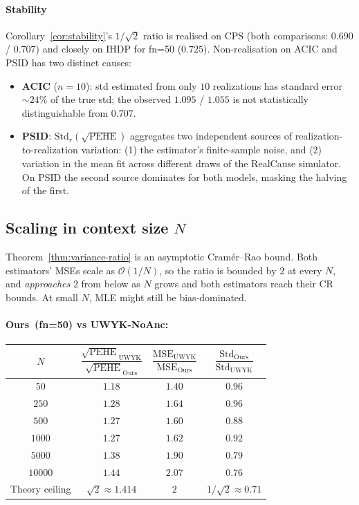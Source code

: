 \documentclass[11pt]{article}
\theoremstyle{remark}
\begin{document}
\paragraph{Stability} Corollary~\ref{cor:stability}'s $1/\sqrt{2}$ ratio is realised on
CPS (both comparisons: $0.690$ / $0.707$) and closely on IHDP for
fn=50 ($0.725$). Non-realisation on ACIC and PSID has two distinct
causes:
\begin{itemize}
  \item \textbf{ACIC} ($n = 10$): std estimated from only $10$
    realizations has standard error $\sim 24\%$ of the true std;
    the observed $1.095$ / $1.055$ is not statistically
    distinguishable from $0.707$.
  \item \textbf{PSID}: $\mathrm{Std}_r(\sqrt{\mathrm{PEHE}})$
    aggregates two independent sources of realization-to-realization
    variation: (1) the estimator's finite-sample noise, and (2) variation in the mean fit across different draws of the
    RealCause simulator. On PSID
    the second source dominates for both models, masking the halving of the first.
\end{itemize}

\subsection{Scaling in context size $N$}
\label{subsec:scaling-N}

Theorem~\ref{thm:variance-ratio} is an asymptotic Cram\'er--Rao
bound. Both estimators' MSEs scale as $\mathcal{O}(1/N)$, so the
ratio is bounded by $2$ at every $N$, and \emph{approaches} $2$
from below as $N$ grows and both estimators reach their CR bounds. At small $N$, MLE might still be bias-dominated.

\paragraph{Ours~(fn=50) vs UWYK-NoAnc:}
\begin{center}
\begin{tabular}{cccc}
\toprule
$N$ &
$\dfrac{\sqrt{\mathrm{PEHE}}_{\text{UWYK}}}{\sqrt{\mathrm{PEHE}}_{\text{Ours}}}$ &
$\dfrac{\mathrm{MSE}_{\text{UWYK}}}{\mathrm{MSE}_{\text{Ours}}}$ &
$\dfrac{\mathrm{Std}_{\text{Ours}}}{\mathrm{Std}_{\text{UWYK}}}$ \\
\midrule
$50$    & $1.18$ & $1.40$ & $0.96$ \\
$250$   & $1.28$ & $1.64$ & $0.96$ \\
$500$   & $1.27$ & $1.60$ & $0.88$ \\
$1000$  & $1.27$ & $1.62$ & $0.92$ \\
$5000$  & $1.38$ & $1.90$ & $0.79$ \\
$10000$ & $\mathbf{1.44}$ & $\mathbf{2.07}$ & $\mathbf{0.76}$ \\
\midrule
Theory ceiling & $\sqrt{2} \approx 1.414$ & $2$ & $1/\sqrt{2} \approx 0.71$ \\
\bottomrule
\end{tabular}
\end{center}
\end{document}
